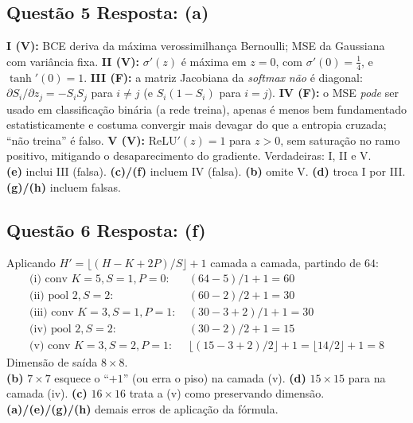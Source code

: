\documentclass[11pt,a4paper]{article}
\begin{document}
\subsection*{Questão 5 \textemdash{} Resposta: (a)}
\textbf{I (V):} BCE deriva da máxima verossimilhança Bernoulli; MSE da Gaussiana com variância fixa.
\textbf{II (V):} $\sigma'(z)$ é máxima em $z = 0$, com $\sigma'(0) = \tfrac{1}{4}$, e $\tanh'(0) = 1$.
\textbf{III (F):} a matriz Jacobiana da \textit{softmax} \emph{não} é diagonal: $\partial S_i/\partial z_j = -S_i S_j$ para $i \neq j$ (e $S_i(1-S_i)$ para $i = j$).
\textbf{IV (F):} o MSE \emph{pode} ser usado em classificação binária (a rede treina), apenas é menos bem fundamentado estatisticamente e costuma convergir mais devagar do que a entropia cruzada; ``não treina'' é falso.
\textbf{V (V):} $\mathrm{ReLU}'(z) = 1$ para $z > 0$, sem saturação no ramo positivo, mitigando o desaparecimento do gradiente.
Verdadeiras: I, II e V.\\
\textbf{(e)} inclui III (falsa).
\textbf{(c)/(f)} incluem IV (falsa).
\textbf{(b)} omite V.
\textbf{(d)} troca I por III.
\textbf{(g)/(h)} incluem falsas.


\subsection*{Questão 6 \textemdash{} Resposta: (f)}
Aplicando $H' = \lfloor (H - K + 2P)/S \rfloor + 1$ camada a camada, partindo de $64$:
\begin{align*}
    \text{(i) conv } K{=}5, S{=}1, P{=}0:&\ (64 - 5)/1 + 1 = 60 \\
    \text{(ii) pool } 2, S{=}2:&\ (60 - 2)/2 + 1 = 30 \\
    \text{(iii) conv } K{=}3, S{=}1, P{=}1:&\ (30 - 3 + 2)/1 + 1 = 30 \\
    \text{(iv) pool } 2, S{=}2:&\ (30 - 2)/2 + 1 = 15 \\
    \text{(v) conv } K{=}3, S{=}2, P{=}1:&\ \lfloor (15 - 3 + 2)/2 \rfloor + 1 = \lfloor 14/2 \rfloor + 1 = 8
\end{align*}
Dimensão de saída $8 \times 8$.\\
\textbf{(b)} $7 \times 7$ esquece o ``$+1$'' (ou erra o piso) na camada (v).
\textbf{(d)} $15 \times 15$ para na camada (iv).
\textbf{(c)} $16 \times 16$ trata a (v) como preservando dimensão.
\textbf{(a)/(e)/(g)/(h)} demais erros de aplicação da fórmula.
\end{document}
